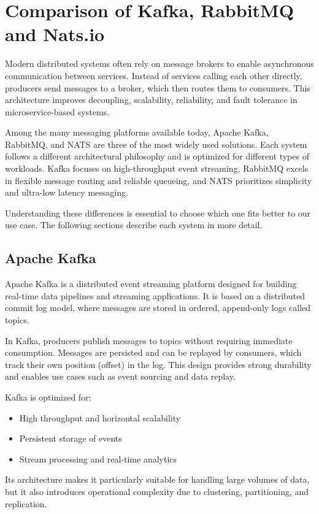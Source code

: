 \section{Comparison of Kafka, RabbitMQ and Nats.io}

Modern distributed systems often rely on message brokers to enable asynchronous communication between services. Instead of services calling each other directly, producers send messages to a broker, which then routes them to consumers. This architecture improves decoupling, scalability, reliability, and fault tolerance in microservice-based systems.

Among the many messaging platforms available today, Apache Kafka, RabbitMQ, and NATS are three of the most widely used solutions. Each system follows a different architectural philosophy and is optimized for different types of workloads. Kafka focuses on high-throughput event streaming, RabbitMQ excels in flexible message routing and reliable queueing, and NATS prioritizes simplicity and ultra-low latency messaging.

Understanding these differences is essential to choose which one fits better to our use case. The following sections describe each system in more detail.

\subsection{Apache Kafka}

Apache Kafka is a distributed event streaming platform designed for building real-time data pipelines and streaming applications. It is based on a distributed commit log model, where messages are stored in ordered, append-only logs called topics.

In Kafka, producers publish messages to topics without requiring immediate consumption. Messages are persisted and can be replayed by consumers, which track their own position (offset) in the log. This design provides strong durability and enables use cases such as event sourcing and data replay.

Kafka is optimized for:
\begin{itemize}
    \item High throughput and horizontal scalability
    \item Persistent storage of events
    \item Stream processing and real-time analytics
\end{itemize}

Its architecture makes it particularly suitable for handling large volumes of data, but it also introduces operational complexity due to clustering, partitioning, and replication.

